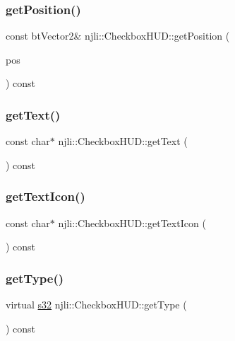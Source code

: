 \subsubsection{\texorpdfstring{get\+Position()}{getPosition()}}
{\footnotesize\ttfamily const bt\+Vector2\& njli\+::\+Checkbox\+H\+U\+D\+::get\+Position (\begin{DoxyParamCaption}\item[{const bt\+Vector2 \&}]{pos }\end{DoxyParamCaption}) const}

\mbox{\label{classnjli_1_1_checkbox_h_u_d_a22abee806c987db2852b4475d41d62bf}} 
\subsubsection{\texorpdfstring{get\+Text()}{getText()}}
{\footnotesize\ttfamily const char$\ast$ njli\+::\+Checkbox\+H\+U\+D\+::get\+Text (\begin{DoxyParamCaption}{ }\end{DoxyParamCaption}) const}

\mbox{\label{classnjli_1_1_checkbox_h_u_d_a2c41c4503415cb8464fa57ebb400cbaf}} 
\subsubsection{\texorpdfstring{get\+Text\+Icon()}{getTextIcon()}}
{\footnotesize\ttfamily const char$\ast$ njli\+::\+Checkbox\+H\+U\+D\+::get\+Text\+Icon (\begin{DoxyParamCaption}{ }\end{DoxyParamCaption}) const}

\mbox{\label{classnjli_1_1_checkbox_h_u_d_a5877b7c1c680c535d1d0878f36a0bbc5}} 
\subsubsection{\texorpdfstring{get\+Type()}{getType()}}
{\footnotesize\ttfamily virtual \mbox{\hyperlink{_util_8h_aa62c75d314a0d1f37f79c4b73b2292e2}{s32}} njli\+::\+Checkbox\+H\+U\+D\+::get\+Type (\begin{DoxyParamCaption}{ }\end{DoxyParamCaption}) const\hspace{0.3cm}{\ttfamily [virtual]}}

